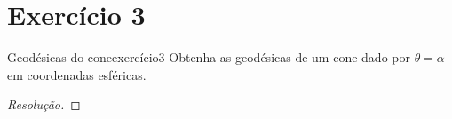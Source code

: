 \section*{Exercício 3}
\begin{exercício}{Geodésicas do cone}{exercício3}
    Obtenha as geodésicas de um cone dado por \(\theta = \alpha\) em coordenadas esféricas.
\end{exercício}
\begin{proof}[Resolução]

\end{proof}
